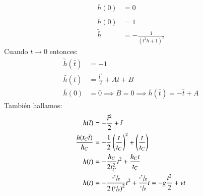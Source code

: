 \begin{ex}[H1.4]
\begin{enumerate}[a)]
\begin{enumerate}[(1)]
\begin{align*}
                \bar h (0) &= 0\\
                \dot{\bar h} (0) &= 1\\
                \ddot{\bar h} &= -\frac{1}{(t^2h+1)^2}
            \end{align*}
            Cuando $t \to 0$ entonces:
            \begin{align*}
                \ddot{\bar h }(\bar t) &= -1\\
                \bar h(\bar t) &= \frac{\bar t^2}{2}+A\bar t + B\\
                \bar h (0) &= 0 \implies B = 0 \implies \bar h (\bar t) = -\bar t + A
            \end{align*}
            También hallamos:
            \begin{align*}
                h(\bar t) &= - \frac{\bar t^2}{2} + \bar t\\
                \frac{h(t_C \bar t)}{h_C} &= -\frac{1}{2}\left(\frac{t}{t_C}\right)^2 + \left(\frac{t}{t_C}\right)\\
                h(t) &= - \frac{h_C}{2t_C^2}t^2 + \frac{h_Ct}{t_C}\\
                h(t) &= - \frac{\sfrac{v^2}{g}}{2 \left( \sfrac{v}{g} \right)^2}t^2 + \frac{\sfrac{v^2}{g}}{\sfrac{v}{g}}t = -g\frac{t^2}{2} + vt
            \end{align*}
        \end{enumerate}
    \end{enumerate}
\end{ex}

